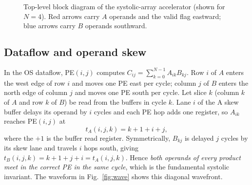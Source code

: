 \documentclass[conference]{IEEEtran}
\begin{document}
\begin{figure}[t]
\caption{Top-level block diagram of the systolic-array accelerator (shown for $N=4$). Red arrows carry $A$ operands and the valid flag eastward; blue arrows carry $B$ operands southward.}
\label{fig:block}
\end{figure}

\subsection{Dataflow and operand skew}\label{sec:dataflow}
In the OS dataflow, PE$(i,j)$ computes
$C_{ij}=\sum_{k=0}^{N-1}A_{ik}B_{kj}$. Row $i$ of $A$ enters the west edge of
row $i$ and moves one PE east per cycle; column $j$ of $B$ enters the north
edge of column $j$ and moves one PE south per cycle. Let slice $k$ (column $k$
of $A$ and row $k$ of $B$) be read from the buffers in cycle $k$. Lane $i$ of
the A skew buffer delays its operand by $i$ cycles and each PE hop adds one
register, so $A_{ik}$ reaches PE$(i,j)$ at
\begin{equation}
t_A(i,j,k) = k + 1 + i + j ,
\end{equation}
where the $+1$ is the buffer read register. Symmetrically, $B_{kj}$ is delayed
$j$ cycles by its skew lane and travels $i$ hops south, giving
$t_B(i,j,k)=k+1+j+i=t_A(i,j,k)$. Hence \emph{both operands of every product
meet in the correct PE in the same cycle}, which is the fundamental systolic
invariant. The waveform in Fig.~\ref{fig:wave} shows this diagonal wavefront.
\end{document}
